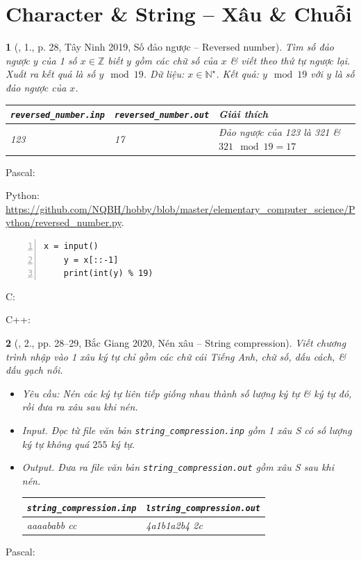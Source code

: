 \documentclass{article}
\newtheorem{baitoan}{}
\begin{document}

\section{Character \& String -- Xâu \& Chuỗi}

\begin{baitoan}[\cite{VietSTEM2021}, 1., p. 28, Tây Ninh 2019, Số đảo ngược -- Reversed number]
	Tìm số đảo ngược $y$ của 1 số $x\in\mathbb{Z}$ biết $y$ gồm các chữ số của $x$ \& viết theo thứ tự ngược lại. Xuất ra kết quả là số $y\mod19$. {\sf Dữ liệu:} $x\in\mathbb{N}^\star$. {\sf Kết quả:} $y\mod19$ với $y$ là số đảo ngược của $x$.
	\begin{table}[H]
		\centering
		\begin{tabular}{|l|l|l|}
			\hline
			\verb|reversed_number.inp| & \verb|reversed_number.out| & Giải thích \\
			\hline
			123 & 17 & Đảo ngược của 123 là 321 \& $321\mod19 = 17$ \\
			\hline
		\end{tabular}
	\end{table}
\end{baitoan}
\noindent Pascal:

Python: \url{https://github.com/NQBH/hobby/blob/master/elementary_computer_science/Python/reversed_number.py}.
\begin{Verbatim}[numbers=left,xleftmargin=5mm]
	x = input()
	y = x[::-1]
	print(int(y) % 19)
\end{Verbatim}
C:

C++:

\begin{baitoan}[\cite{VietSTEM2021}, 2., pp. 28--29, Bắc Giang 2020, Nén xâu -- String compression]
	Viết chương trình nhập vào 1 xâu ký tự chỉ gồm các chữ cái Tiếng Anh, chữ số, dấu cách, \& dấu gạch nối.
	\begin{itemize}
		\item {\sf Yêu cầu:} Nén các ký tự liên tiếp giống nhau thành số lượng ký tự \& ký tự đó, rồi đưa ra xâu sau khi nén.
		\item {\sf Input.} Đọc từ file văn bản \verb|string_compression.inp| gồm 1 xâu S có số lượng ký tự không quá $255$ ký tự.
		\item {\sf Output.} Đưa ra file văn bản \verb|string_compression.out| gồm xâu S sau khi nén.
		\begin{table}[H]
			\centering
			\begin{tabular}{|l|l|}
				\hline
				\verb|string_compression.inp| & \verb|lstring_compression.out| \\
				\hline
				aaaababb    cc & 4a1b1a2b4 2c \\
				\hline
			\end{tabular}
		\end{table}
	\end{itemize}
\end{baitoan}
\noindent Pascal:
\end{document}
